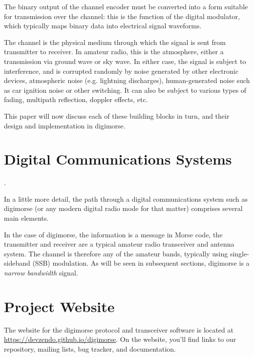 \documentclass[a4paper]{tufte-handout}
\begin{document}
    The binary output of the channel encoder must be converted into a form suitable for transmission over the
    channel: this is the function of the digital modulator, which typically maps binary data into electrical signal
    waveforms.

    The channel is the physical medium through which the signal is sent from transmitter to receiver. In amateur
    radio, this is the atmosphere, either a transmission via ground wave or sky wave. In either case, the signal is
    subject to interference, and is corrupted randomly by noise generated by other electronic devices, atmospheric
    noise (e.g. lightning discharges), human-generated noise such as car ignition noise or other switching. It can
    also be subject to various types of fading, multipath reflection, doppler effects, etc.



    This paper will now discuss each of these building blocks in turn, and their design and implementation in digimorse.


\section{Digital Communications Systems}
    .

    In a little more detail, the path through a digital communications system such as digimorse (or any modern
    digital radio mode for that matter) comprises several main elements.




    In the case of digimorse, the information is a message in Morse code, the transmitter and receiver are a typical
    amateur radio transceiver and antenna system. The channel is therefore any of the amateur bands, typically using
    single-sideband (SSB) modulation. As will be seen in subsequent sections, digimorse is a \emph{narrow bandwidth}
    signal.


    \section{Project Website}

The website for the digimorse protocol and transceiver software is located at
\url{https://devzendo.github.io/digimorse}. On the website, you'll find
links to our  repository, mailing lists, bug tracker, and documentation.
\end{document}
